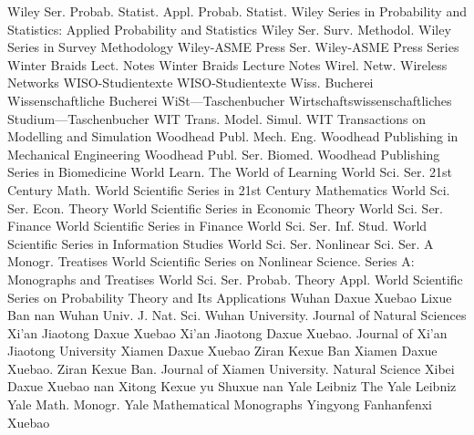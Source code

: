 {Wiley Ser. Probab. Statist. Appl. Probab. Statist.}
{Wiley Series in Probability and Statistics: Applied Probability and Statistics}
{Wiley Ser. Surv. Methodol.}
{Wiley Series in Survey Methodology}
{Wiley-ASME Press Ser.}
{Wiley-ASME Press Series}
{Winter Braids Lect. Notes}
{Winter Braids Lecture Notes}
{Wirel. Netw.}
{Wireless Networks}
{WISO-Studientexte}
{WISO-Studientexte}
{Wiss. Bucherei}
{Wissenschaftliche Bucherei}
{WiSt---Taschenbucher}
{Wirtschaftswissenschaftliches Studium---Taschenbucher}
{WIT Trans. Model. Simul.}
{WIT Transactions on Modelling and Simulation}
{Woodhead Publ. Mech. Eng.}
{Woodhead Publishing in Mechanical Engineering}
{Woodhead Publ. Ser. Biomed.}
{Woodhead Publishing Series in Biomedicine}
{World Learn.}
{The World of Learning}
{World Sci. Ser. 21st Century Math.}
{World Scientific Series in 21st Century Mathematics}
{World Sci. Ser. Econ. Theory}
{World Scientific Series in Economic Theory}
{World Sci. Ser. Finance}
{World Scientific Series in Finance}
{World Sci. Ser. Inf. Stud.}
{World Scientific Series in Information Studies}
{World Sci. Ser. Nonlinear Sci. Ser. A Monogr. Treatises}
{World Scientific Series on Nonlinear Science. Series A: Monographs and Treatises}
{World Sci. Ser. Probab. Theory Appl.}
{World Scientific Series on Probability Theory and Its Applications}
{Wuhan Daxue Xuebao Lixue Ban}
{nan}
{Wuhan Univ. J. Nat. Sci.}
{Wuhan University. Journal of Natural Sciences}
{Xi'an Jiaotong Daxue Xuebao}
{Xi'an Jiaotong Daxue Xuebao. Journal of Xi'an Jiaotong University}
{Xiamen Daxue Xuebao Ziran Kexue Ban}
{Xiamen Daxue Xuebao. Ziran Kexue Ban. Journal of Xiamen University. Natural Science}
{Xibei Daxue Xuebao}
{nan}
{Xitong Kexue yu Shuxue}
{nan}
{Yale Leibniz}
{The Yale Leibniz}
{Yale Math. Monogr.}
{Yale Mathematical Monographs}
{Yingyong Fanhanfenxi Xuebao}
